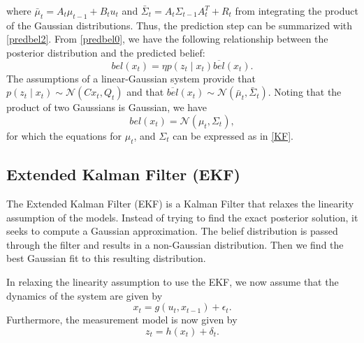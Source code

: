 \documentclass[twoside]{article}
\begin{document}
where $\bar{\mu}_t = A_t\mu_{t-1} + B_t u_t$ and $\bar{\Sigma}_t = A_t \Sigma_{t-1} A_t^T + R_t$ from integrating the product of the Gaussian distributions. Thus, the prediction step can be summarized with \eqref{predbel2}.
From \eqref{predbel0}, we have the following relationship between the posterior distribution and the predicted belief:
\begin{equation}
bel(x_t) = \eta p(z_t \mid x_t) \overline{bel}(x_t).
\end{equation}
The assumptions of a linear-Gaussian system provide that $p(z_t \mid x_t) \sim \mathcal{N}(Cx_t, Q_t)$ and that $\overline{bel}(x_t) \sim \mathcal{N}(\bar{\mu}_t, \bar{\Sigma}_t)$. Noting that the product of two Gaussians is Gaussian, we have
\begin{equation}
bel(x_t) = \mathcal{N}(\mu_t, \Sigma_t),
\end{equation}
for which the equations for $\mu_t$, and $\Sigma_t$ can be expressed as in \eqref{KF}.

\subsection{Extended Kalman Filter (EKF)}

The Extended Kalman Filter (EKF) is a Kalman Filter that relaxes the linearity assumption of the models. Instead of trying to find the exact posterior solution, it seeks to compute a Gaussian approximation.  The belief distribution is passed through the filter and results in a non-Gaussian distribution. Then we find the best Gaussian fit to this resulting distribution. 

In relaxing the linearity assumption to use the EKF, we now assume that the dynamics of the system are given by
\begin{equation}
    x_t = g(u_t,x_{t-1}) + \epsilon_{t}.
\end{equation}
Furthermore, the measurement model is now given by
\begin{equation}
    z_t = h(x_t) + \delta_{t}.
\end{equation}
\end{document}
